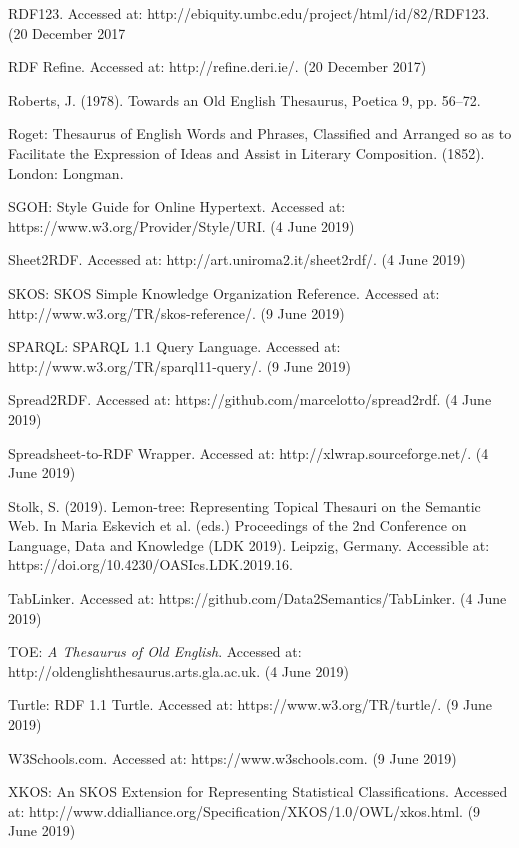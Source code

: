 RDF123. Accessed at: http://ebiquity.umbc.edu/project/html/id/82/RDF123. (20 December 2017

RDF Refine. Accessed at: http://refine.deri.ie/. (20 December 2017)

Roberts, J. (1978). Towards an Old English Thesaurus, Poetica 9, pp. 56–72.

Roget: Thesaurus of English Words and Phrases, Classified and Arranged so as to Facilitate the Expression of Ideas and Assist in Literary Composition. (1852). London: Longman.

SGOH: Style Guide for Online Hypertext. Accessed at: https://www.w3.org/Provider/Style/URI. (4 June 2019)

Sheet2RDF. Accessed at:  http://art.uniroma2.it/sheet2rdf/. (4 June 2019)

SKOS: SKOS Simple Knowledge Organization Reference. Accessed at: http://www.w3.org/TR/skos-reference/. (9 June 2019)

SPARQL: SPARQL 1.1 Query Language. Accessed at: http://www.w3.org/TR/sparql11-query/. (9 June 2019)

Spread2RDF. Accessed at: https://github.com/marcelotto/spread2rdf. (4 June 2019)

Spreadsheet-to-RDF Wrapper. Accessed at: http://xlwrap.sourceforge.net/. (4 June 2019)

Stolk, S. (2019). Lemon-tree: Representing Topical Thesauri on the Semantic Web. In Maria Eskevich et al. (eds.) Proceedings of the 2nd Conference on Language, Data and Knowledge (LDK 2019). Leipzig, Germany. Accessible at: https://doi.org/10.4230/OASIcs.LDK.2019.16.

TabLinker. Accessed at: https://github.com/Data2Semantics/TabLinker. (4 June 2019)

TOE: \textit{A Thesaurus of Old English}. Accessed at: http://oldenglishthesaurus.arts.gla.ac.uk. (4 June 2019)

Turtle: RDF 1.1 Turtle. Accessed at: https://www.w3.org/TR/turtle/. (9 June 2019)

W3Schools.com. Accessed at: https://www.w3schools.com. (9 June 2019)

XKOS: An SKOS Extension for Representing Statistical Classifications. Accessed at: http://www.ddialliance.org/Specification/XKOS/1.0/OWL/xkos.html. (9 June 2019)